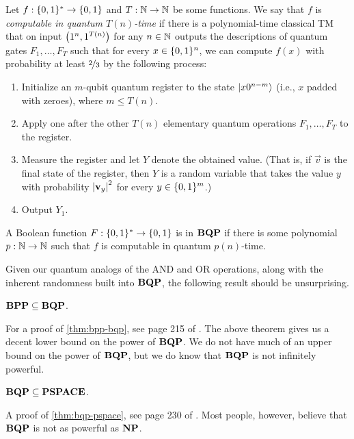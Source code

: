 \documentclass[12pt]{article}
\begin{document}
\begin{defn}
  \label{defn:bqp}
  Let $f : \zo^* \to \zo$ and $T : \NN \to \NN$ be some functions. We say that
  $f$ is \emph{computable in quantum $T(n)$-time} if there is a polynomial-time
  classical TM that on input $\paren*{1^n, 1^{T(n)}}$ for any $n \in \NN$
  outputs the descriptions of quantum gates $F_1, \dots, F_T$ such that for
  every $x\in \zo^n$, we can compute $f(x)$ with probability at least
  $\nfrac{2}{3}$ by the following process:
  \begin{enumerate}
    \item Initialize an $m$-qubit quantum register to the state
      $\reg*{x0^{n-m}}$ (i.e., $x$ padded with zeroes), where $m \le T(n)$.
    \item Apply one after the other $T(n)$ elementary quantum operations $F_1,
      \dots, F_T$ to the register.
    \item Measure the register and let $Y$ denote the obtained value. (That is,
      if $\vec{v}$ is the final state of the register, then $Y$ is a random
      variable that takes the value $y$ with probability $\abs*{\vec{v}_y}^2$
      for every $y \in \zo^m$.)
    \item Output $Y_1$.
  \end{enumerate}
  A Boolean function $F : \zo^* \to \zo$ is in $\BQP$ if there is some
  polynomial $p : \NN \to \NN$ such that $f$ is computable in quantum
  $p(n)$-time.
\end{defn}

Given our quantum analogs of the AND and OR operations, along with the inherent
randomness built into $\BQP$, the following result should be unsurprising.

\begin{thm}
  \label{thm:bpp-bqp}
  $\BPP \subseteq \BQP$.
\end{thm}

For a proof of \cref{thm:bpp-bqp}, see page 215 of \cite{AB09}. The above
theorem gives us a decent lower bound on the power of $\BQP$. We do not have
much of an upper bound on the power of $\BQP$, but we do know that $\BQP$ is not
infinitely powerful.

\begin{thm}
  \label{thm:bqp-pspace}
  $\BQP \subseteq \PSPACE$.
\end{thm}

A proof of \cref{thm:bqp-pspace}, see page 230 of \cite{AB09}. Most people,
however, believe that $\BQP$ is not as powerful as $\NP$.
\end{document}

